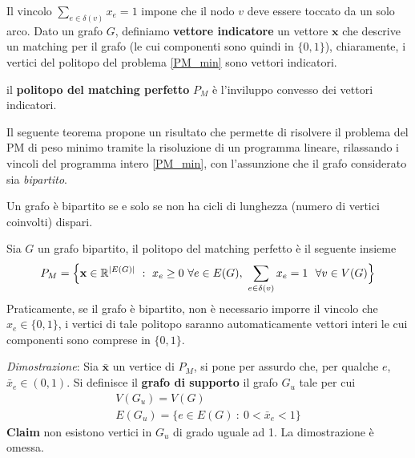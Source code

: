 \documentclass[10pt, letterpaper]{report}
\newcommand{\x}{{\mathbf{x}}}
\begin{document}
Il vincolo $\sum_{e\in\delta(v)}x_e=1$ impone che il nodo $v$ deve essere toccato da un solo arco. Dato un grafo $G$, definiamo \textbf{vettore indicatore} un vettore $\x$ che descrive un matching per il grafo (le cui componenti sono quindi in $\{0,1\}$), chiaramente, i vertici del politopo del problema \ref{PM_min} sono vettori indicatori.
\begin{definizione}
    il \textbf{politopo del matching perfetto} $P_M$ è l'inviluppo convesso dei vettori indicatori.
\end{definizione}
Il seguente teorema propone un risultato che permette di risolvere il problema del PM di peso minimo tramite la risoluzione di un programma lineare, rilassando i vincoli del programma intero \ref{PM_min}, con l'assunzione che il grafo considerato sia \textit{bipartito}.
\begin{proposizione}\label{cicli_pari}
    Un grafo è bipartito se e solo se non ha cicli di lunghezza (numero di vertici coinvolti) dispari.
\end{proposizione}
\begin{teorema}
    Sia $G$ un grafo bipartito, il politopo del matching perfetto è il seguente insieme 
    $$ P_M= \Big\{
    \mathbf x \in \R^{|E(G)|} \ : \ x_e\ge0 \  \forall e\in E(G),   \ 
    \sum_{e\in\delta(v)}x_e=1 \ \ \forall v\in V(G) 
    \Big\}$$
    Praticamente, se il grafo è bipartito, non è necessario imporre il vincolo che $x_e\in\{0,1\}$, i vertici di tale politopo saranno automaticamente vettori interi le cui componenti sono comprese in $\{0,1\}$.
\end{teorema}
\textit{Dimostrazione}: Sia $\bar\x$ un vertice di $P_M$, si pone per assurdo che, per qualche $e$, $\bar x_e\in (0,1)$. Si definisce il \textbf{grafo di supporto} il grafo $G_u$ tale per cui \begin{eqnarray*}
    V(G_u)=V(G)\\
    E(G_u)=\{e\in E(G) \ : \ 0<\bar x_e<1\} 
\end{eqnarray*}
\textbf{Claim} non esistono vertici in $G_u$ di grado uguale ad 1. La dimostrazione è omessa.\bigskip
\end{document}
